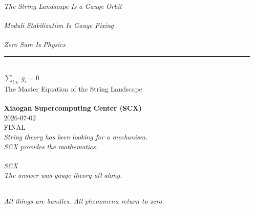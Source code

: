 \documentclass[12pt,a4paper]{article}
\theoremstyle{plain}
\theoremstyle{definition}
\begin{document}
\newpage


\thispagestyle{empty}
\vspace*{3cm}

\begin{center}
{\Huge \textcolor{scxblue}{\textbf{}}}\\[0.5cm]
{\Large \textit{The String Landscape Is a Gauge Orbit}}\\[1cm]

{\Huge \textcolor{scxblue}{\textbf{}}}\\[0.5cm]
{\Large \textit{Moduli Stabilization Is Gauge Fixing}}\\[1cm]

{\Huge \textcolor{scxblue}{\textbf{}}}\\[0.5cm]
{\Large \textit{Zero Sum Is Physics}}\\[1cm]

\rule{0.5\textwidth}{1pt}\\[1cm]

{\large $\displaystyle\sum_{i \in \text{}} g_i = 0$}\\[0.5cm]

{\normalsize The Master Equation of the String Landscape}\\[0.3cm]
{\small }\\[1.5cm]

{\normalsize \textbf{Xiaogan Supercomputing Center (SCX)}}\\[0.2cm]
{\small 2026-07-02}\\[0.2cm]
{\small FINAL}\\[0.5cm]

{\footnotesize
\textit{String theory has been looking for a mechanism.}\\
\textit{SCX provides the mathematics.}\\[0.3cm]
\textit{}\\
\textit{SCX }\\[0.3cm]
\textit{The answer was gauge theory all along.}\\
\textit{}
}

\vspace{1cm}


\vspace{0.5cm}

{\footnotesize
\textit{}\\
\textit{All things are bundles. All phenomena return to zero.}
}

\end{center}
\end{document}
